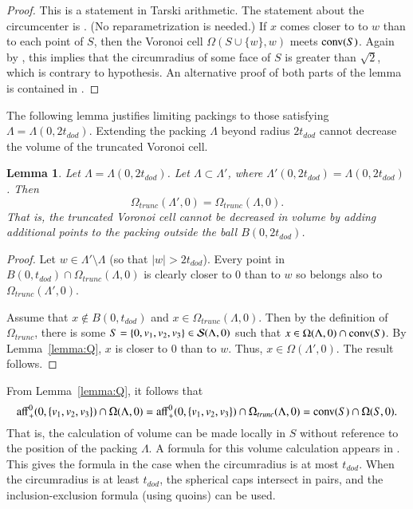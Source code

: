 \documentclass{article} %
\newtheorem{lemma}{Lemma}[subsection]
\begin{document}
\begin{proof} This is a statement in Tarski arithmetic.
The statement about the circumcenter is \cite[Lemma~5.18]{Hales:2006:DCG}.
(No reparametrization is needed.)
If $x$  comes closer to  to $w$  than to each point of $S$, then
the Voronoi cell $\Omega(S\cup\{w\},w)$ meets ${\operatorname{conv}}(S)$.
Again by \cite[Lemma~5.18]{Hales:2006:DCG}, this implies that the circumradius
of some face of $S$ is greater than $\sqrt2$, which is contrary
to hypothesis. An alternative proof 
of both parts of the lemma
is contained in \cite[Lemma~3.5,3.6]{Hales:2002:Dodec}.
\end{proof}

The following lemma justifies limiting packings to those
satisfying $\Lambda=\Lambda(0,2t_{dod})$.  Extending the packing
$\Lambda$ beyond radius $2t_{dod}$ cannot decrease the volume of the
truncated Voronoi cell.

\begin{lemma}\label{lemma:trunc}  
Let $\Lambda=\Lambda(0,2t_{dod})$.  Let $\Lambda\subset\Lambda'$,
where $\Lambda'(0,2t_{dod}) = \Lambda(0,2t_{dod})$.  Then
$$\Omega_{trunc}(\Lambda',0) = \Omega_{trunc}(\Lambda,0).
$$
That is, the truncated Voronoi cell cannot be decreased in volume by
adding additional points to the packing outside the ball $B(0,2t_{dod})$.
\end{lemma}

\begin{proof} Let $w\in \Lambda'\setminus\Lambda$ (so that  $|w|>2t_{dod}$).
Every point in $B(0,t_{dod})\cap \Omega_{trunc}(\Lambda,0)$ 
is clearly closer to $0$ than to $w$ so
belongs also to $\Omega_{trunc}(\Lambda',0)$.

Assume that $x\not\in B(0,t_{dod})$ and $x\in \Omega_{trunc}(\Lambda,0)$.
Then by the definition of $\Omega_{trunc}$,
there is some $S=\{0,v_1,v_2,v_3\}\in {\mathcal S}(\Lambda,0)$ such that
$x\in \Omega(\Lambda,0)\cap {\operatorname{conv}}(S)$.  By Lemma~\ref{lemma:Q},
$x$ is closer to $0$ than to $w$.  Thus, $x\in\Omega(\Lambda',0)$.
The result follows.
\end{proof}

From Lemma~\ref{lemma:Q}, it follows that
\begin{equation}\label{eqn:omega-3}
{\operatorname{aff}}^0_+(0,\{v_1,v_2,v_3\}) \cap \Omega(\Lambda,0) = 
{\operatorname{aff}}^0_+(0,\{v_1,v_2,v_3\}) \cap \Omega_{trunc}(\Lambda,0) = 
{\operatorname{conv}}(S)\cap\Omega(S,0).
\end{equation}
That is, the calculation of volume can be made locally in $S$ without
reference to the position of the packing $\Lambda$.
A formula for this volume calculation appears in 
\cite[\S8.6.3]{Hales:1997:DCG}.  This gives the formula in the case
when the circumradius is at most $t_{dod}$.  When the circumradius
is at least $t_{dod}$, the spherical caps intersect in pairs,
and the inclusion-exclusion formula (using quoins)
can be used.
\end{document}
